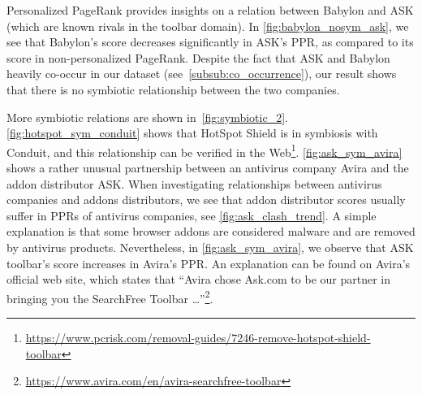 \documentclass[11pt,oneside]{book}
\begin{document}
Personalized PageRank provides insights on a relation between Babylon and ASK (which are known rivals in the toolbar domain). In \autoref{fig:babylon_nosym_ask}, we see that Babylon's score decreases significantly in ASK's PPR, as compared to its score in non-personalized PageRank. Despite the fact that ASK and Babylon heavily co-occur in our dataset (see~\autoref{subsub:co_occurrence}), our result shows that there is no symbiotic relationship between the two companies. 

More symbiotic relations are shown in~\autoref{fig:symbiotic_2}. \autoref{fig:hotspot_sym_conduit} shows that HotSpot Shield is in symbiosis with Conduit, and this relationship can be verified in the Web\footnote{\url{https://www.pcrisk.com/removal-guides/7246-remove-hotspot-shield-toolbar}}. \autoref{fig:ask_sym_avira} shows a rather unusual partnership between an antivirus company Avira and the addon distributor ASK. When investigating relationships between antivirus companies and addons distributors, we see that addon distributor scores usually suffer in PPRs of antivirus companies, see \autoref{fig:ask_clash_trend}. A simple explanation is that some browser addons are considered malware and are removed by antivirus products. Nevertheless, in \autoref{fig:ask_sym_avira}, we observe that ASK toolbar's score increases in Avira's PPR. An explanation can be found on Avira's official web site, which states that ``Avira chose Ask.com to be our partner in bringing you the SearchFree Toolbar \dots''\footnote{\label{avira_ask}\url{https://www.avira.com/en/avira-searchfree-toolbar}}. 
\end{document}
